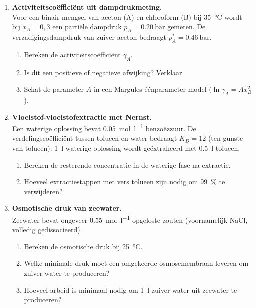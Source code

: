 \begin{enumerate}
\item \textbf{Activiteitsco\"effici\"ent uit dampdrukmeting.} \\
Voor een binair mengsel van aceton (A) en chloroform (B) bij \SI{35}{\celsius} wordt bij $x_A = 0{,}3$ een parti\"ele dampdruk $p_A = \SI{0.20}{\bar}$ gemeten. De verzadigingsdampdruk van zuiver aceton bedraagt $p_A^* = \SI{0.46}{\bar}$.
\begin{enumerate}
\item[(a)] Bereken de activiteitsco\"effici\"ent $\gamma_A$.
\item[(b)] Is dit een positieve of negatieve afwijking? Verklaar.
\item[(c)] Schat de parameter $A$ in een Margules-\'e\'enparameter-model ($\ln \gamma_A = A x_B^2$).
\end{enumerate}

\item \textbf{Vloeistof-vloeistofextractie met Nernst.} \\
Een waterige oplossing bevat \SI{0.05}{\mole\per\litre} benzo\"ezzuur. De verdelingsco\"effici\"ent tussen tolueen en water bedraagt $K_D = 12$ (ten gunste van tolueen). \SI{1}{\litre} waterige oplossing wordt ge\"extraheerd met \SI{0.5}{\litre} tolueen.
\begin{enumerate}
\item[(a)] Bereken de resterende concentratie in de waterige fase na extractie.
\item[(b)] Hoeveel extractiestappen met vers tolueen zijn nodig om \SI{99}{\percent} te verwijderen?
\end{enumerate}

\item \textbf{Osmotische druk van zeewater.} \\
Zeewater bevat ongeveer \SI{0.55}{\mole\per\litre} opgeloste zouten (voornamelijk NaCl, volledig gedissocieerd).
\begin{enumerate}
\item[(a)] Bereken de osmotische druk bij \SI{25}{\celsius}.
\item[(b)] Welke minimale druk moet een omgekeerde-osmosemembraan leveren om zuiver water te produceren?
\item[(c)] Hoeveel arbeid is minimaal nodig om \SI{1}{\litre} zuiver water uit zeewater te produceren?
\end{enumerate}

\end{enumerate}


